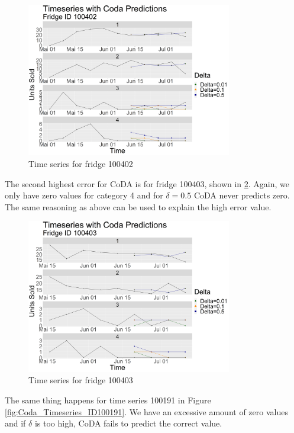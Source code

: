 \begin{figure}[htbp]
	\centering
		\includegraphics[width=0.80\textwidth]{Graphiken/Coda_Timeseries_VariationdL100402.png}
	\caption{Time series for fridge 100402}
	\label{fig:Coda_Timeseries_ID100402}
\end{figure}

The second highest error for CoDA is for fridge 100403, shown in \ref{fig:Coda_Timeseries_ID100403}. Again, we only have zero values for category 4 and for $\delta=0.5$ CoDA never predicts zero. The same reasoning as above can be used to explain the high error value. 

\begin{figure}[htbp]
	\centering
		\includegraphics[width=0.80\textwidth]{Graphiken/Coda_Timeseries_VariationdL100403.png}
	\caption{Time series for fridge 100403}
	\label{fig:Coda_Timeseries_ID100403}
\end{figure}

The same thing happens for time series 100191 in Figure \ref{fig:Coda_Timeseries_ID100191}. We have an excessive amount of zero values and if $\delta$ is too high, CoDA fails to predict the correct value. 

